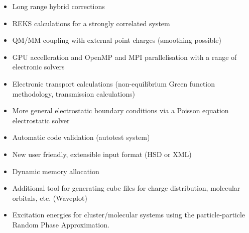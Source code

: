 \begin{itemize}
\item Long range hybrid corrections
\item REKS calculations for a strongly correlated system
\item QM/MM coupling with external point charges (smoothing possible)
\item GPU accelleration and OpenMP and MPI parallelisation with a
  range of electronic solvers
\item Electronic transport calculations (non-equilibrium Green function
  methodology, transmission calculations)
\item More general electrostatic boundary conditions via a Poisson equation
  electrostatic solver
\item Automatic code validation (autotest system)
\item New user friendly, extensible input format (HSD or XML)
\item Dynamic memory allocation
\item Additional tool for generating cube files for charge distribution,
  molecular orbitals, etc. (Waveplot)
\item Excitation energies for cluster/molecular systems using the particle-particle Random Phase Approximation.   
\end{itemize}
